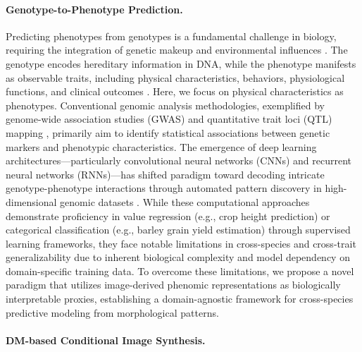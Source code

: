 \paragraph{Genotype-to-Phenotype Prediction.}
Predicting phenotypes from genotypes is a fundamental challenge in biology, requiring the integration of genetic makeup and environmental influences \cite{via1985genotype,bochner2003new,dowell2010genotype}. The genotype encodes hereditary information in DNA, while the phenotype manifests as observable traits, including physical characteristics, behaviors, physiological functions, and clinical outcomes \cite{klose1999genotypes}. Here, we focus on physical characteristics as phenotypes.
Conventional genomic analysis methodologies, exemplified by genome-wide association studies (GWAS) \cite{uffelmann2021genome,tam2019benefits} and quantitative trait loci (QTL) mapping \cite{khatkar2004quantitative,kendziorski2006review}, primarily aim to identify statistical associations between genetic markers and phenotypic characteristics. The emergence of deep learning architectures—particularly convolutional neural networks (CNNs) and recurrent neural networks (RNNs)—has shifted paradigm toward decoding intricate genotype-phenotype interactions through automated pattern discovery in high-dimensional genomic datasets \cite{wang2024prediction,magnusson2022deep,danilevicz2022plant,wang2024lstm,annan2023machine}. While these computational approaches demonstrate proficiency in value regression (e.g., crop height prediction) or categorical classification (e.g., barley grain yield estimation) through supervised learning frameworks, they face notable limitations in cross-species and cross-trait generalizability due to inherent biological complexity and model dependency on domain-specific training data.  To overcome these limitations, we propose a novel paradigm that utilizes image-derived phenomic representations as biologically interpretable proxies, establishing a domain-agnostic framework for cross-species predictive modeling from morphological patterns.





\paragraph{DM-based Conditional Image Synthesis.}

